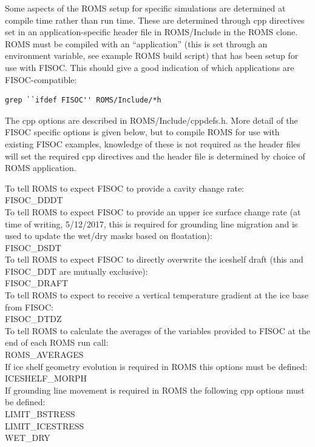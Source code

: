 \documentclass[11pt]{article}
\begin{document}
Some aspects of the ROMS setup for specific simulations are determined at 
compile time rather than run time. 
These are determined through cpp directives set in an application-specific 
header file in ROMS/Include in the ROMS clone. 
ROMS must be compiled with an ``application'' (this is set through an 
environment variable, see example ROMS build script) that has been setup for 
use with FISOC. 
This should give a good indication of which applications are FISOC-compatible:
\begin{lstlisting}
grep ``ifdef FISOC'' ROMS/Include/*h
\end{lstlisting}

The cpp options are described in ROMS/Include/cppdefs.h. 
More detail of the FISOC specific options is given below, but to compile ROMS 
for use with 
existing FISOC examples, knowledge of these is not required as the header 
files will set the required cpp directives and the header file is determined by 
choice of ROMS application.

\begin{flushleft}
To tell ROMS to expect FISOC to provide a cavity change rate:\\
FISOC\_DDDT\\
To tell ROMS to expect FISOC to provide an upper ice surface change rate
(at time of writing, 5/12/2017, this is required for grounding line migration 
and is used to update the wet/dry masks based on floatation):\\
FISOC\_DSDT\\
To tell ROMS to expect FISOC to directly overwrite the iceshelf draft 
(this and FISOC\_DDT are mutually exclusive):\\
FISOC\_DRAFT\\
To tell ROMS to expect to receive a vertical temperature gradient 
at the ice base from FISOC: \\
FISOC\_DTDZ\\
To tell ROMS to calculate the averages of the variables provided to FISOC at 
the end of each ROMS run call:\\
ROMS\_AVERAGES\\
If ice shelf geometry evolution is required in ROMS this options must be 
defined:\\
ICESHELF\_MORPH\\
If grounding line movement is required in ROMS the following cpp options 
must be defined:\\
LIMIT\_BSTRESS\\
LIMIT\_ICESTRESS\\
WET\_DRY
\end{flushleft}
\end{document}

